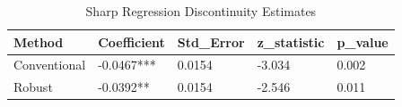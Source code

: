 \begin{table}[ht]
\centering
\caption{Sharp Regression Discontinuity Estimates} 
\label{tab:sharp_rd}
\begin{tabular}{lllll}
  \hline
Method & Coefficient & Std\_Error & z\_statistic & p\_value \\ 
  \hline
Conventional & -0.0467*** & 0.0154 & -3.034 & 0.002 \\ 
  Robust & -0.0392** & 0.0154 & -2.546 & 0.011 \\ 
   \hline
\end{tabular}
\end{table}
